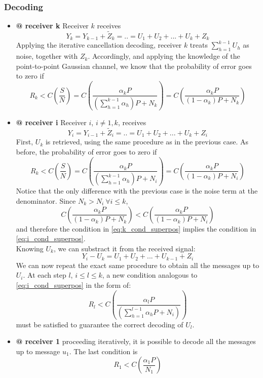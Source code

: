 \subsubsection*{Decoding}
\begin{itemize}
\item \textbf{@ receiver k} Receiver $k$ receives
\begin{equation}
Y_k = Y_{k-1}+\tilde{Z}_k = .. = U_1 + U_2 + ... +U_k + Z_k
\end{equation}
Applying the iterative cancellation decoding, receiver $k$ treats $\sum_{h=1}^{k-1} U_h$ as noise, together with $Z_k$. Accordingly, and applying the knowledge of the point-to-point Gaussian channel, we know that the probability of error goes to zero if
\begin{equation}
  R_k<C\left(\frac{S}{N}\right) = C\left(\frac{\alpha_k P}{\left(\sum_{h=1}^{k-1}\alpha_h \right)P + N_k}\right) = C\left(\frac{\alpha_k P}{\left(1-\alpha_k\right)P + N_k}\right)
  \label{eq:k_cond_superpos}
\end{equation}
\item \textbf{@ receiver i} Receiver $i$, $i\neq 1,k$, receives
\begin{equation}
Y_i = Y_{i-1}+\tilde{Z}_i = .. = U_1 + U_2 + ... +U_k + Z_i
\end{equation}
First, $U_k$ is retrieved, using the same procedure as in the previous case.
As before, the probability of error goes to zero if
\begin{equation}
  R_k<C\left(\frac{S}{N}\right) = C\left(\frac{\alpha_k P}{\left(\sum_{h=1}^{k-1}\alpha_h \right)P + N_i}\right) = C\left(\frac{\alpha_k P}{\left(1-\alpha_k\right)P + N_i}\right)
  \label{eq:i_cond_superpos}
\end{equation}
Notice that the only difference with the previous case is the noise term at the denominator. Since $N_k>N_i\ \forall i\leq k$,
\begin{equation}
  C\left(\frac{\alpha_k P}{\left(1-\alpha_k\right)P + N_k}\right)<C\left(\frac{\alpha_k P}{\left(1-\alpha_k\right)P + N_i}\right)
\end{equation}
and therefore the condition in \ref{eq:k_cond_superpos} implies the condition in \ref{eq:i_cond_superpos}.\\
Knowing $U_k$, we can substract it from the received signal:
\begin{equation}
Y_i - U_k = U_1 + U_2 + ... +U_{k-1} + Z_i
\end{equation}
We can now repeat the exact same procedure to obtain all the messages up to $U_i$. At each step $l$, $i\leq l \leq k$, a new condition analogous to \ref{eq:i_cond_superpos} in the form of:
\begin{equation}
  R_l< C\left(\frac{\alpha_l P}{\left(\sum_{h=1}^{l-1}\alpha_h P+N_i\right)}\right)
\end{equation}
 must be satisfied to guarantee the correct decoding of $U_l$.
\item \textbf{@ receiver 1} proceeding iteratively, it is possible to decode all the messages up to message $u_1$. The last condition is
\begin{equation}
  R_1<C\left(\frac{\alpha_1 P}{N_1}\right)
\end{equation}
\end{itemize}
